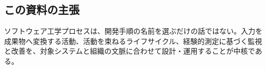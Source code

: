 \subsection*{この資料の主張}
ソフトウェア工学プロセスは、開発手順の名前を選ぶだけの話ではない。入力を成果物へ変換する活動、活動を束ねるライフサイクル、経験的測定に基づく監視と改善を、対象システムと組織の文脈に合わせて設計・運用することが中核である。
